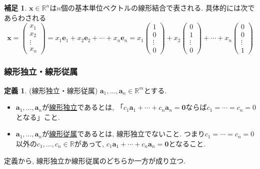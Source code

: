 \documentclass[dvipdfmx,a4paper,11pt]{article}
\newcommand{\R}{\mathbb{R}}
\theoremstyle{definition}
\newtheorem{dfn}[thm]{定義}
\newtheorem{rem}[thm]{補足}
\begin{document}
\begin{rem}
$\bm{x} \in \R^n$は$n$個の基本単位ベクトルの線形結合で表される. 具体的には次であらわされる
$$
\bm{x}
=
\begin{pmatrix}
x_1\\x_2\\\vdots\\x_n
\end{pmatrix}
=
x_1 \bm{e}_1 + x_2 \bm{e}_2 + \cdots + x_n\bm{e}_n 
=
x_1 \begin{pmatrix}
1\\0\\\vdots\\0
\end{pmatrix} + x_2 \begin{pmatrix}
0\\1\\\vdots\\0
\end{pmatrix} + \cdots + x_n\begin{pmatrix}
0\\0\\\vdots\\1
\end{pmatrix} 
$$
\end{rem}

\subsubsection{線形独立・線形従属}
\begin{tcolorbox}[
    colback = white,
    colframe = green!35!black,
    fonttitle = \bfseries,
    breakable = true]
    \begin{dfn}(線形独立・線形従属\cite[定義2.1]{M})
    \label{dfn-linear-independent}
    $\bm{a}_1, \ldots, \bm{a}_n \in \R^m$とする. 
    \begin{itemize}
	\setlength{\parskip}{0cm}
  	\setlength{\itemsep}{0pt} 
\item $\bm{a}_1, \ldots, \bm{a}_n $が\underline{線形独立}であるとは, 
「$c_1\bm{a}_1 + \cdots+ c_n\bm{a}_n = \bm{0}$ならば$c_1=\cdots =c_n =0$となる」こと.
\item $\bm{a}_1, \ldots, \bm{a}_n $が\underline{線形従属}であるとは, 
線形独立でないこと. つまり$c_1=\cdots =c_n =0$以外の$c_1, \ldots, c_n \in \R$があって, $c_1\bm{a}_1 + \cdots + c_n\bm{a}_n = \bm{0}$となること.
\end{itemize}
    \end{dfn}
 \end{tcolorbox}
 定義から, 線形独立か線形従属のどちらか一方が成り立つ. 
 
\end{document}
